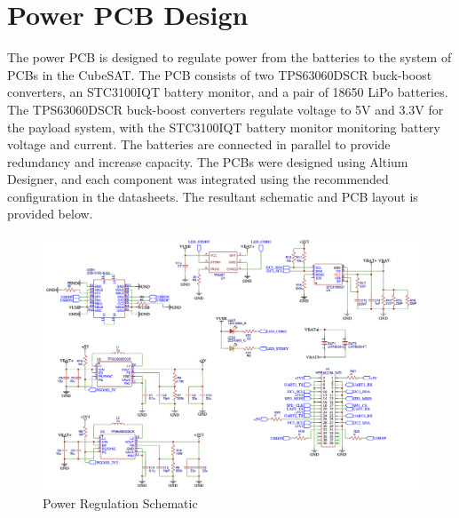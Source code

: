 \documentclass{report}
\begin{document}
        \section{Power PCB Design}
            The power PCB is designed to regulate power from the batteries to the system of PCBs in the CubeSAT.
            The PCB consists of two TPS63060DSCR buck-boost converters, an STC3100IQT battery monitor, and a pair of 18650 LiPo batteries.
            The TPS63060DSCR buck-boost converters regulate voltage to 5V and 3.3V for the payload system, with the STC3100IQT battery monitor
            monitoring battery voltage and current.
            The batteries are connected in parallel to provide redundancy and increase capacity. The PCBs were designed using Altium Designer,
            and each component was integrated using the recommended configuration in the datasheets. 
            The resultant schematic and PCB layout is provided below.
            \begin{figure}[H]
                \centering
                \includegraphics[width=0.6\linewidth]{figures/PWR_SCHM.png}
                \caption{Power Regulation Schematic}
                \label{fig:power}
            \end{figure}
\end{document}
